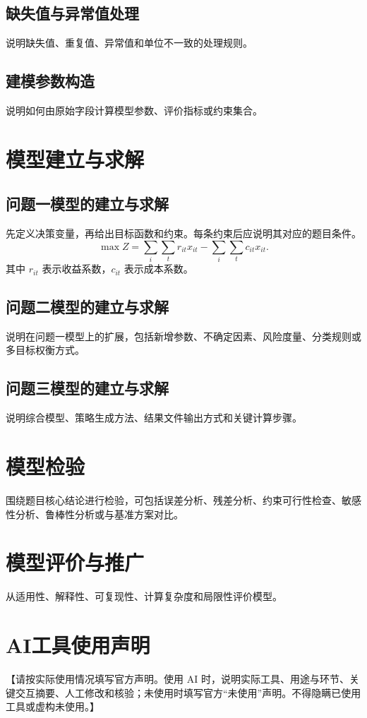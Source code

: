 \documentclass[withoutpreface,bwprint]{cumcmthesis}
\begin{document}
\subsection{缺失值与异常值处理}
说明缺失值、重复值、异常值和单位不一致的处理规则。

\subsection{建模参数构造}
说明如何由原始字段计算模型参数、评价指标或约束集合。

\section{模型建立与求解}
\subsection{问题一模型的建立与求解}
先定义决策变量，再给出目标函数和约束。每条约束后应说明其对应的题目条件。
\begin{equation}
  \max Z = \sum_{i}\sum_t r_{it}x_{it} - \sum_i\sum_t c_{it}x_{it}.
\end{equation}
其中 $r_{it}$ 表示收益系数，$c_{it}$ 表示成本系数。

\subsection{问题二模型的建立与求解}
说明在问题一模型上的扩展，包括新增参数、不确定因素、风险度量、分类规则或多目标权衡方式。

\subsection{问题三模型的建立与求解}
说明综合模型、策略生成方法、结果文件输出方式和关键计算步骤。

\section{模型检验}
围绕题目核心结论进行检验，可包括误差分析、残差分析、约束可行性检查、敏感性分析、鲁棒性分析或与基准方案对比。

\section{模型评价与推广}
从适用性、解释性、可复现性、计算复杂度和局限性评价模型。

\section*{AI工具使用声明}
【请按实际使用情况填写官方声明。使用 AI 时，说明实际工具、用途与环节、关键交互摘要、人工修改和核验；未使用时填写官方“未使用”声明。不得隐瞒已使用工具或虚构未使用。】
\end{document}
